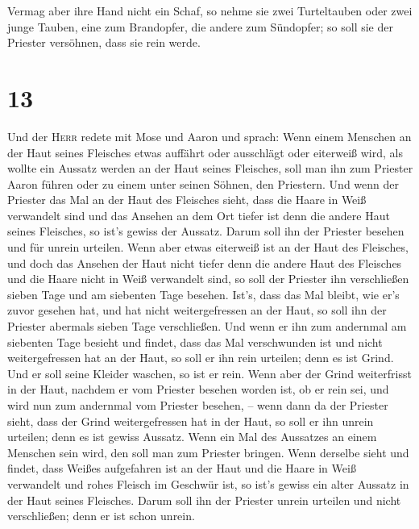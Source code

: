  Vermag aber ihre Hand nicht ein Schaf, so nehme sie zwei
Turteltauben oder zwei junge Tauben, eine zum Brandopfer, die andere zum
Sündopfer; so soll sie der Priester versöhnen, dass sie rein werde.

\hypertarget{section-12}{%
\section{13}\label{section-12}}

 Und der \textsc{Herr} redete mit Mose und Aaron und
sprach:  Wenn einem Menschen an der Haut seines Fleisches
etwas auffährt oder ausschlägt oder eiterweiß wird, als wollte ein
Aussatz werden an der Haut seines Fleisches, soll man ihn zum Priester
Aaron führen oder zu einem unter seinen Söhnen, den Priestern.
 Und wenn der Priester das Mal an der Haut des Fleisches
sieht, dass die Haare in Weiß verwandelt sind und das Ansehen an dem Ort
tiefer ist denn die andere Haut seines Fleisches, so ist's gewiss der
Aussatz. Darum soll ihn der Priester besehen und für unrein urteilen.
 Wenn aber etwas eiterweiß ist an der Haut des Fleisches,
und doch das Ansehen der Haut nicht tiefer denn die andere Haut des
Fleisches und die Haare nicht in Weiß verwandelt sind, so soll der
Priester ihn verschließen sieben Tage  und am siebenten
Tage besehen. Ist's, dass das Mal bleibt, wie er's zuvor gesehen hat,
und hat nicht weitergefressen an der Haut,  so soll ihn
der Priester abermals sieben Tage verschließen. Und wenn er ihn zum
andernmal am siebenten Tage besieht und findet, dass das Mal
verschwunden ist und nicht weitergefressen hat an der Haut, so soll er
ihn rein urteilen; denn es ist Grind. Und er soll seine Kleider waschen,
so ist er rein.  Wenn aber der Grind weiterfrisst in der
Haut, nachdem er vom Priester besehen worden ist, ob er rein sei, und
wird nun zum andernmal vom Priester besehen, --  wenn dann
da der Priester sieht, dass der Grind weitergefressen hat in der Haut,
so soll er ihn unrein urteilen; denn es ist gewiss Aussatz.
 Wenn ein Mal des Aussatzes an einem Menschen sein wird,
den soll man zum Priester bringen.  Wenn derselbe sieht
und findet, dass Weißes aufgefahren ist an der Haut und die Haare in
Weiß verwandelt und rohes Fleisch im Geschwür ist,  so
ist's gewiss ein alter Aussatz in der Haut seines Fleisches. Darum soll
ihn der Priester unrein urteilen und nicht verschließen; denn er ist
schon unrein.

